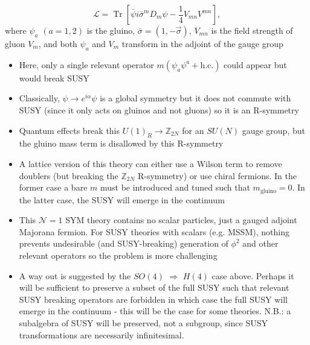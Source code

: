 \begin{equation}
    \mathcal{L} = \operatorname{Tr}\left[ \bar{\psi} i \bar{\sigma}^m D_m \psi - \frac{1}{4} V_{mn}V^{mn}\right],
\end{equation}
where $\psi_a$ $(a = 1,2)$ is the gluino, $\bar{\sigma} = (1, -\vec{\sigma})$, $V_{mn}$ is the field strength of gluon $V_m$, and both $\psi_a$ and $V_m$ transform in the adjoint of the gauge group
\begin{itemize}
    \item Here, only a single relevant operator $m(\psi_a \psi^a + \text{h.c.})$ could appear but would break SUSY
    \item Classically, $\psi \to e^{i \alpha} \psi$ is a global symmetry but it does not commute with SUSY (since it only acts on gluinos and not gluons) so it is an R-symmetry
    \item Quantum effects break this $U(1)_R \to \mathbb{Z}_{2N}$ for an $SU(N)$ gauge group, but the gluino mass term is disallowed by this R-symmetry
    \item A lattice version of this theory can either use a Wilson term to remove doublers (but breaking the $\mathbb{Z}_{2N}$ R-symmetry) or use chiral fermions. In the former case a bare $m$ must be introduced and tuned such that $m_\text{gluino} = 0$. In the latter case, the SUSY will emerge in the continuum
    \item This $\mathcal{N} = 1$ SYM theory contains no scalar particles, just a gauged adjoint Majorana fermion. For SUSY theories with scalars (e.g. MSSM), nothing prevents undesirable (and SUSY-breaking) generation of $\phi^2$ and other relevant operators so the problem is more challenging
    \item A way out is suggested by the $SO(4)$ $\Rightarrow$ $H(4)$ case above. Perhaps it will be sufficient to preserve a subset of the full SUSY such that relevant SUSY breaking operators are forbidden in which case the full SUSY will emerge in the continuum - this will be the case for some theories. N.B.: a subalgebra of SUSY will be preserved, not a subgroup, since SUSY transformations are necessarily infinitesimal.
\end{itemize}

